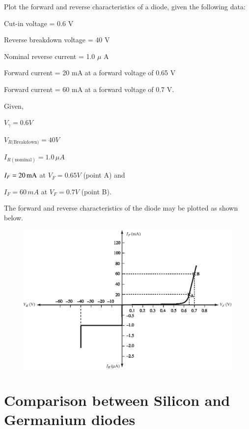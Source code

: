 \begin{example}\label{exam1.5}
Plot the forward and reverse characteristics of a diode, given the
following data:

Cut-in voltage = 0.6 V

Reverse breakdown voltage = 40 V

Nominal reverse current = 1.0 $\mu$ A

Forward current = 20 mA at a forward voltage of 0.65 V

Forward current = 60 mA at a forward voltage of 0.7 V.
\end{example}

\begin{solution}
Given,

$V_\gamma = 0.6 V$

$V_{R\text{(Breakdown)}} = 40 V$

$I_{R(\text{nominal})} = 1.0\, \mu A$

$I_F = 20 \operatorname{mA}$ at $V_F = 0.65 V$ (point A) and 

$I_F = 60\,mA$ at $V_F = 0.7 V$ (point B).

The forward and reverse characteristics of the diode may be plotted as
shown below.
\begin{figure}[H]
\centering
\includegraphics{chap1/S3-EE-01-012.eps}
\end{figure}
\vskip -1cm
\end{solution}

\eject

\section{Comparison between Silicon and Germanium diodes}\label{sec1.9}

